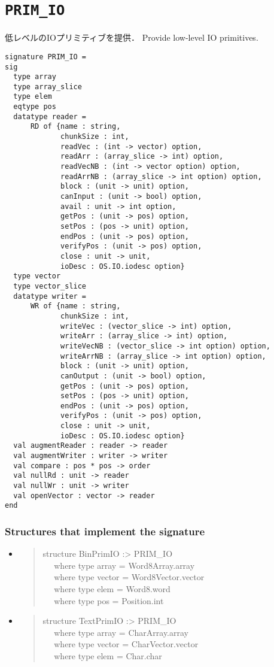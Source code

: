 \documentclass{jbook}
\newcommand{\txt}[2]{#2}
\newcommand{\myem}{\mbox{\ \ }}
\newenvironment{program}{\begin{quote}\begin{tt}}%
                        {\end{tt}\end{quote}}
\newcommand{\signature}[2]{
\section{{\tt #1}}\label{section:reference:#2}
}
\newcommand{\Structure}{\subsubsection*{\txt{シグネチャを実装するストラクチャ}{Structures that implement the signature}}}
\begin{document}
\signature{PRIM\_IO}{PRIMIO}
\ifjp%
	低レベルのIOプリミティブを提供．
\else%
	Provide low-level IO primitives.
\fi%

\begin{verbatim}
signature PRIM_IO =
sig
  type array
  type array_slice
  type elem
  eqtype pos
  datatype reader =
      RD of {name : string,
             chunkSize : int,
             readVec : (int -> vector) option,
             readArr : (array_slice -> int) option,
             readVecNB : (int -> vector option) option,
             readArrNB : (array_slice -> int option) option,
             block : (unit -> unit) option,
             canInput : (unit -> bool) option,
             avail : unit -> int option,
             getPos : (unit -> pos) option,
             setPos : (pos -> unit) option,
             endPos : (unit -> pos) option,
             verifyPos : (unit -> pos) option,
             close : unit -> unit,
             ioDesc : OS.IO.iodesc option}
  type vector
  type vector_slice
  datatype writer =
      WR of {name : string,
             chunkSize : int,
             writeVec : (vector_slice -> int) option,
             writeArr : (array_slice -> int) option,
             writeVecNB : (vector_slice -> int option) option,
             writeArrNB : (array_slice -> int option) option,
             block : (unit -> unit) option,
             canOutput : (unit -> bool) option,
             getPos : (unit -> pos) option,
             setPos : (pos -> unit) option,
             endPos : (unit -> pos) option,
             verifyPos : (unit -> pos) option,
             close : unit -> unit,
             ioDesc : OS.IO.iodesc option}
  val augmentReader : reader -> reader
  val augmentWriter : writer -> writer
  val compare : pos * pos -> order
  val nullRd : unit -> reader
  val nullWr : unit -> writer
  val openVector : vector -> reader
end
\end{verbatim}

\Structure
\begin{itemize}
\item 
\begin{program}
structure BinPrimIO :> PRIM\_IO
\\\myem
  where type array = Word8Array.array
\\\myem
  where type vector = Word8Vector.vector
\\\myem
  where type elem = Word8.word
\\\myem
  where type pos = Position.int
\end{program}

\item 
\begin{program}
structure TextPrimIO :> PRIM\_IO
\\\myem
  where type array = CharArray.array
\\\myem
  where type vector = CharVector.vector
\\\myem
  where type elem = Char.char
\end{program}
\end{itemize}
\end{document}
